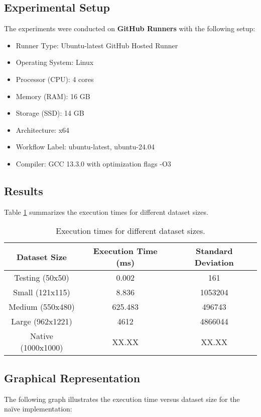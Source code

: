 \documentclass[12pt]{article}
\begin{document}
\subsection{Experimental Setup}
The experiments were conducted on \textbf{GitHub Runners} with the following setup:
\begin{itemize}
    \item Runner Type: Ubuntu-latest GitHub Hosted Runner
    \item Operating System: Linux
    \item Processor (CPU): 4 cores
    \item Memory (RAM): 16 GB
    \item Storage (SSD): 14 GB
    \item Architecture: x64
    \item Workflow Label: ubuntu-latest, ubuntu-24.04
    \item Compiler: GCC 13.3.0 with optimization flags -O3
\end{itemize}

\subsection{Results}
Table \ref{tab:results} summarizes the execution times for different dataset sizes.

\begin{table}[h]
    \begin{tabular}{|c|c|c|}
        \hline
        \textbf{Dataset Size} & \textbf{Execution Time (ms)} & \textbf{Standard Deviation} \\
        \hline
        Testing (50x50) & 0.002 & 161 \\
        Small (121x115) & 8.836 & 1053204 \\
        Medium (550x480) & 625.483 & 496743 \\
        Large (962x1221) & 4612 & 4866044 \\
        Native (1000x1000) & XX.XX & XX.XX \\
        \hline
    \end{tabular}
        \caption{Execution times for different dataset sizes.}
        \label{tab:results}
    \end{table}

\subsection{Graphical Representation}
The following graph illustrates the execution time versus dataset size for the naïve implementation:
\end{document}
